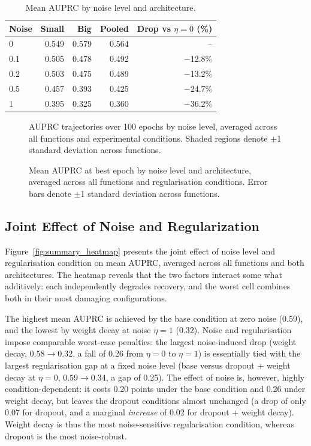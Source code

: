 \documentclass{article}
\begin{document}
\begin{table}[htbp]
\centering
\caption{Mean AUPRC by noise level and architecture.}
\label{tab:auprc_by_noise}
\begin{tabular}{lrrrr}
\toprule
Noise & Small & Big & Pooled & Drop vs $\eta=0$ (\%) \\
\midrule
0   & 0.549 & 0.579 & 0.564 & -- \\
0.1 & 0.505 & 0.478 & 0.492 & $-$12.8\% \\
0.2 & 0.503 & 0.475 & 0.489 & $-$13.2\% \\
0.5 & 0.457 & 0.393 & 0.425 & $-$24.7\% \\
1   & 0.395 & 0.325 & 0.360 & $-$36.2\% \\
\bottomrule
\end{tabular}
\end{table}

\begin{figure}[htbp]
    \centering
    
    \caption{AUPRC trajectories over 100 epochs by noise level,
    averaged across all functions and experimental conditions. Shaded regions
    denote $\pm$1 standard deviation across functions.}
    \label{fig:auprc_by_noise}
\end{figure}

\begin{figure}[htbp]
    \centering
    
    \caption{Mean AUPRC at best epoch by noise level and
    architecture, averaged across all functions and regularisation conditions.
    Error bars denote $\pm$1 standard deviation across functions.}
    \label{fig:noise_effect_by_model_size}
\end{figure}

\FloatBarrier
\subsection{Joint Effect of Noise and Regularization}

Figure~\ref{fig:summary_heatmap} presents the joint effect of noise level and
regularisation condition on mean AUPRC, averaged across all functions and both
architectures. The heatmap reveals that the two factors interact some what additively:
each independently degrades recovery, and the worst cell
combines both in their most damaging configurations.

The highest mean AUPRC is achieved by the base condition at zero noise (0.59),
and the lowest by weight decay at noise $\eta = 1$ (0.32).
Noise and regularisation impose comparable worst-case penalties:
the largest noise-induced drop (weight decay, $0.58 \rightarrow 0.32$,
a fall of 0.26 from $\eta = 0$ to $\eta = 1$)
is essentially tied with the largest regularisation gap at
a fixed noise level (base versus dropout + weight decay at $\eta = 0$, $0.59 \rightarrow 0.34$,
a gap of 0.25). The effect of noise is, however, highly condition-dependent:
it costs 0.20 points under the base condition and 0.26 under weight decay,
but leaves the dropout conditions almost unchanged
(a drop of only 0.07 for dropout, and a marginal \emph{increase} of 0.02 for dropout + weight decay).
Weight decay is thus the most noise-sensitive regularisation condition,
whereas dropout is the most noise-robust.
\end{document}
